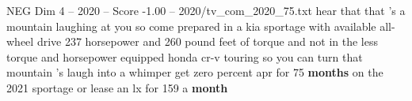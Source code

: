 \begin{textsample}{NEG Dim 4 – 2020 – Score -1.00 – 2020/tv\_com\_2020\_75.txt}  \label{ex:f4_neg_069}
hear that that 's a mountain laughing at you so come prepared in a kia sportage with available all-wheel drive 237 horsepower and 260 pound feet of torque and not in the less torque and horsepower equipped honda cr-v touring so you can turn that mountain 's laugh into a whimper get zero percent apr for 75 \textbf{months} on the 2021 sportage or lease an lx for 159 a \textbf{month}

\end{textsample}
